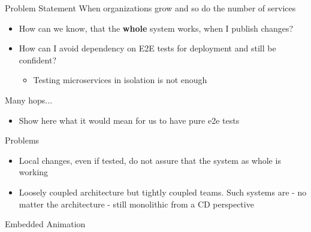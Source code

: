 \begin{frame}{Problem Statement}
  When organizations grow and so do the number of services
  \begin{itemize}
    \item How can we know, that the \textbf{whole} system works, when I publish changes?
    \item How can I avoid dependency on E2E tests for deployment and still be confident?
    \begin{itemize}
      \item Testing microservices in isolation is not enough
    \end{itemize}
  \end{itemize}
\end{frame}

\begin{frame}{Many hops...}
  \begin{itemize}
    \item Show here what it would mean for us to have pure e2e tests
  \end{itemize}
\end{frame}

\begin{frame}{Problems}
  \begin{itemize}
    [<+->]
    \item Local changes, even if tested, do not assure that the system as whole is working
    \item Loosely coupled architecture but tightly coupled teams. Such systems are - no matter the architecture - still monolithic from a CD perspective
  \end{itemize}
\end{frame}

\begin{frame}{Embedded Animation}
\end{frame}
